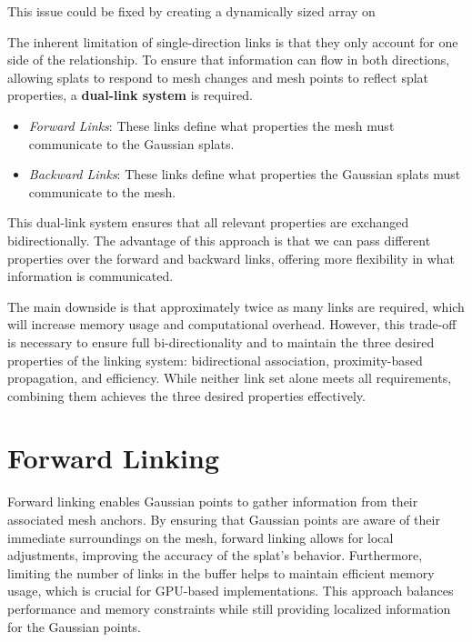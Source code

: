 This issue could be fixed by creating a dynamically sized array on 

The inherent limitation of single-direction links is that they only account for one side of the relationship. To ensure that information can flow in both directions, allowing splats to respond to mesh changes and mesh points to reflect splat properties, a \textbf{dual-link system} is required.  

\begin{itemize}
    \item \textit{Forward Links}: These links define what properties the mesh must communicate to the Gaussian splats.  
    \item \textit{Backward Links}: These links define what properties the Gaussian splats must communicate to the mesh.  
\end{itemize}

This dual-link system ensures that all relevant properties are exchanged bidirectionally. The advantage of this approach is that we can pass different properties over the forward and backward links, offering more flexibility in what information is communicated. 

The main downside is that approximately twice as many links are required, which will increase memory usage and computational overhead. However, this trade-off is necessary to ensure full bi-directionality and to maintain the three desired properties of the linking system: bidirectional association, proximity-based propagation, and efficiency. While neither link set alone meets all requirements, combining them achieves the three desired properties effectively.





\section{Forward Linking}

Forward linking enables Gaussian points to gather information from their associated mesh anchors. By ensuring that Gaussian points are aware of their immediate surroundings on the mesh, forward linking allows for local adjustments, improving the accuracy of the splat’s behavior. Furthermore, limiting the number of links in the buffer helps to maintain efficient memory usage, which is crucial for GPU-based implementations. This approach balances performance and memory constraints while still providing localized information for the Gaussian points.

